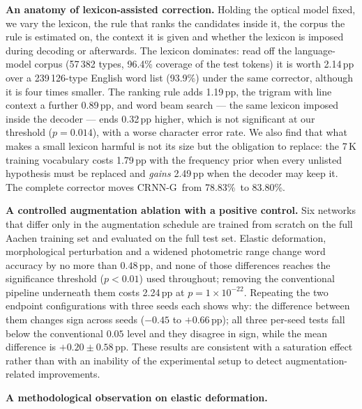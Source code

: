 \documentclass{ws-ijprai}
\newcommand{\oursnolm}{CRNN-G}         %
\newcommand{\ourwa}{83.80\%}
\newcommand{\rawwa}{78.83\%}
\newcommand{\anchordelta}{2.24}        %
\begin{document}
\begin{itemlist}
  \item \textbf{An anatomy of lexicon-assisted correction.} Holding the
        optical model fixed, we vary the lexicon, the rule that ranks the
        candidates inside it, the corpus the rule is estimated on, the
        context it is given and whether the lexicon is imposed during
        decoding or afterwards. The lexicon dominates: read off the
        language-model corpus (57\,382 types, 96.4\% coverage of the test
        tokens) it is worth
        2.14\,pp over a
        239\,126-type English word list (93.9\%) under the same corrector,
        although it is four times smaller. The ranking rule adds
        1.19\,pp,
        the trigram with line context a further
        0.89\,pp,
        and word beam search --- the same lexicon imposed inside the decoder
        --- ends 0.32\,pp higher, which is not significant at our threshold
        ($p=0.014$), with a worse character error rate. We also find that what makes a
        small lexicon harmful is not its size but the obligation to replace:
        the 7\,K training vocabulary costs
        1.79\,pp with the frequency prior when
        every unlisted hypothesis must be replaced and \emph{gains}
        2.49\,pp
        when the decoder may keep it. The complete corrector moves
        \oursnolm\ from \rawwa\ to \ourwa.
  \item \textbf{A controlled augmentation ablation with a positive
        control.} Six networks that differ only in the augmentation
        schedule are trained from scratch on the full Aachen training
        set and evaluated on the full test set. Elastic deformation,
        morphological perturbation and a widened photometric range
        change word accuracy by no more than $0.48$\,pp, and none of
        those differences reaches the significance threshold ($p<0.01$)
        used throughout; removing the conventional pipeline underneath them
        costs \anchordelta\,pp at $p=1\times10^{-22}$. Repeating the two
        endpoint configurations with three seeds each shows why: the
        difference between them changes sign across seeds ($-0.45$ to
        $+0.66$\,pp); all three per-seed tests fall below the conventional
        $0.05$ level and they disagree in sign, while the mean difference
        is $+0.20\pm0.58$\,pp. These results are consistent with a
saturation effect rather than with an inability of the experimental
setup to detect augmentation-related improvements.
  \item \textbf{A methodological observation on elastic deformation.}

\end{itemlist}
\end{document}
